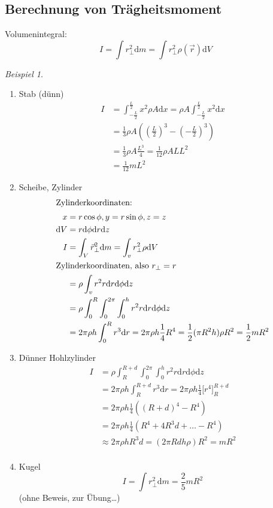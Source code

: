 \documentclass[a4paper]{scrartcl}
\renewcommand{\d}{\mathrm{d}}
\renewcommand{\v}[1]{\vec{#1}}
\theoremstyle{definition}
\theoremstyle{plain}
\theoremstyle{plain}
\theoremstyle{remark}
\theoremstyle{remark}
\theoremstyle{remark}
\newtheorem{ex}{Beispiel}
\begin{document}
\subsection{Berechnung von Trägheitsmoment}
\label{sec-8-5}
Volumenintegral:
\[I = \int r_\perp^2 \d m = \int r_{\perp}^2 \rho(\v r) \d V\]
\begin{ex}
\begin{enumerate}
\item Stab (dünn)
\begin{align*}
I &= \int_{-\frac{L}{2}}^{\frac{L}{2}} x^2 \rho A \d x = \rho A \int_{-\frac{L}{2}}^{\frac{L}{2}} x^2 \d x \\
&= \frac{1}{3} \rho A ((\frac{L}{2})^3 - (- \frac{L}{2})^3) \\
&= \frac{1}{3} \rho A \frac{L^3}{4} = \frac{1}{12} \rho AL L^2 \\
&= \frac{1}{12} m L^2
\end{align*}
\item Scheibe, Zylinder
\begin{align*}
\intertext{Zylinderkoordinaten:}
x &= r \cos{\phi}, y = r\sin{\phi}, z = z \\
\d V &= r\d \phi \d r \d z \\
I &= \int_V \v r_\perp^2 \d m = \int_v r_\perp^2 \rho \d V \\
\intertext{Zylinderkoordinaten, also $r_\perp = r$}
&= \rho \int_v r^2 r \d r \d \phi \d z \\
&= \rho \int_{0}^{R} \int_{0}^{2\pi}\int_{0}^{h} r^2 r \d r \d \phi \d z \\
&= 2\pi \rho h \int_{0}^{R} r^3 \d r = 2 \pi \rho h \frac{1}{4} R^4 = \frac{1}{2} (\pi R^2 h) \rho R^2 = \frac{1}{2} m R^2 \\
\end{align*}
\item Dünner Hohlzylinder
\begin{align*}
I &= \rho \int_{R}^{R + d} \int_{0}^{2\pi} \int_{0}^{h} r^2 r \d r \d \phi \d z \\
&= 2\pi \rho h \int_{R}^{R + d} r^3 \d r = 2\pi \rho h \frac{1}{4} \Big[ r^4 \Big]_R^{R + d} \\
&= 2\pi \rho h \frac{1}{4} ((R + d)^4 - R^4) \\
&= 2\pi \rho h \frac{1}{4} (R^4 + 4 R^3 d + \ldots - R^4) \\
&\approx 2\pi \rho h R^3 d = (2 \pi Rdh \rho)R^2 = mR^2 \\
\end{align*}
\item Kugel
\[I = \int r_{\perp}^2 \d m = \frac{2}{5} m R^2\]
(ohne Beweis,  zur Übung\ldots{})
\end{enumerate}
\end{ex}
\end{document}
